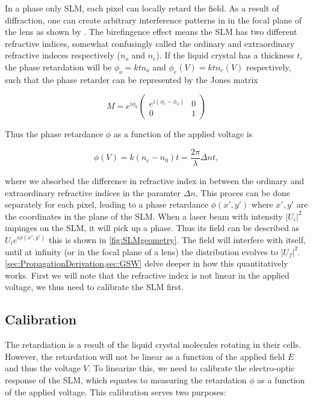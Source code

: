 In a phase only \ac{SLM}, each pixel can locally retard the field. 
As a result of diffraction, one can create arbitrary interference patterns in in the focal plane of the lens as shown by \cite{Bijnen2013}. 
The birefingence effect means the \ac{SLM} has two different refractive indices, somewhat confusingly called the ordinary and extraordinary refractive indeces respectively ($n_o$ and $n_e$). 
If the liquid crystal has a thickness $t$, the phase retardation will be $\phi_o = k t n_o$ and $\phi_e(V) = k t n_e(V)$ respectively, such that the phase retarder can be represented by the Jones matrix \cite{Guzman2017}

\begin{equation}\label{eq:JonesMatrix}
    M = e^{i \phi_0} 
    \begin{pmatrix}
        e^{i(\phi_e-\phi_o)} & 0\\
        0 & 1
    \end{pmatrix}
\end{equation}

Thus the phase retardance $\phi$ as a function of the applied voltage is \cite{Guzman2017}

\begin{equation}
    \phi(V) = k (n_e - n_0) t = \frac{2\pi}{\lambda} \Delta n t,
\end{equation}

where we absorbed the difference in refractive index in between the ordinary and extraordinary refractive indices in the paramter $\Delta n$.
This proces can be done separately for each pixel, leading to a phase retardance $
\phi(x',y')$ where $x',y'$ are the coordinates in the plane of the SLM. When a laser beam with intensity $|U_i|^2$ impinges on the SLM, it will pick up a phase. 
Thus its field can be described as $U_i e^{i\phi(x',y')}$ this is shown in \cref{fig:SLMgeometry}. 
The field will interfere with itself, until at infinity (or in the focal plane of a lens) the distribution evolves to $|U_f|^2$.
\cref{sec:PropagationDerivation,sec:GSW} delve deeper in how this quantitatively works. First we will note that the refractive index is not linear in the applied voltage, we thus need to calibrate the SLM first. 

\subsection{Calibration}

The retardiation is a result of the liquid crystal molecules rotating in their cells.
However, the retardation will not be linear as a function of the applied field $E$ and thus the voltage $V$. 
To linearize this, we need to calibrate the electro-optic response of the \ac{SLM}, which equates to measuring the retardation $\phi$ as a function of the applied voltage. 
This calibration serves two purposes:

